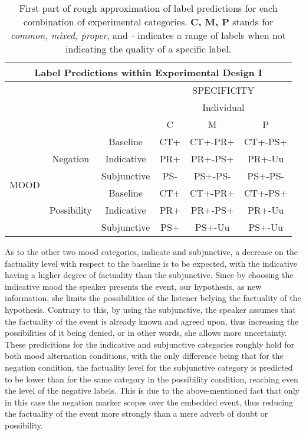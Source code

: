 \begin{table}
\centering
\begin{tabular}{|c|c|c|c|c|c|}
\hline
\multicolumn{6}{|c|}{Label Predictions within Experimental Design I}\\\hline
                      & & &\multicolumn{3}{c|}{SPECIFICITY} \\\cline{4-6} 
                      & & & \multicolumn{3}{c|}{Individual}\\\cline{4-6} 
                      & & & C & M & P\\\hline 
\multirow{6}{*}{MOOD} & \multirow{3}{*}{Negation} & Baseline & CT+ & CT+-PR+ & CT+-PS+\\\cline{3-6}
                      &                           & Indicative & PR+ & PR+-PS+ & PR+-Uu \\\cline{3-6}
                      &                           & Subjunctive & PS- & PS+-PS- & PS+-PS-\\ \cline{2-6}\cline{2-6}                     
                      &\multirow{3}{*}{Possibility}& Baseline & CT+ & CT+-PR+ & CT+-PS+\\\cline{3-6}
                      &                           & Indicative & PR+ & PR+-PS+ & PR+-Uu\\\cline{3-6}
                      &                           & Subjunctive & PS+ & PS+-Uu & PS+-Uu\\\hline                                                          
\end{tabular}
\caption[Label predictions I.]{First part of rough approximation of label predictions for each combination of experimental categories. \textbf{C, M, P} stands for \textit{common, mixed, proper}, and \textit{-} indicates a range of labels when not indicating the quality of a specific label.}
\label{tab:pilpredict1}
\end{table}

As to the other two mood categories, indicate and subjunctive, a decrease on the factuality level with respect to the baseline is to be expected, with the indicative having a higher degree of factuality than the subjunctive. Since by choosing the indicative mood the speaker presents the event, our hypothesis, as new information, she limits the possibilities of the listener belying the factuality of the hypothesis. Contrary to this, by using the subjunctive, the speaker assumes that the factuality of the event is already known and agreed upon, thus increasing the possibilities of it being denied, or in other words, she allows more uncertainty. These predicitions for the indicative and subjunctive categories roughly hold for both mood alternation conditions, with the only difference being that for the negation condition, the factuality level for the subjunctive category is predicted to be lower than for the same category in the possibility condition, reaching even the level of the negative labels. This is due to the above-mentioned fact that only in this case the negation marker scopes over the embedded event, thus reducing the factuality of the event more strongly than a mere adverb of doubt or possibility.\\

